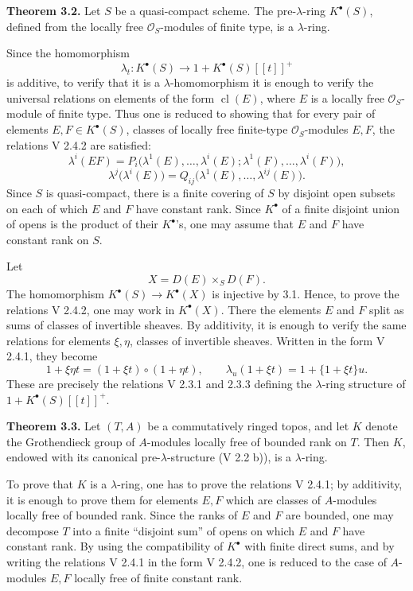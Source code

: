 \documentclass[11pt]{article}
\begin{document}
\textbf{Theorem 3.2.} Let \(S\) be a quasi-compact scheme. The pre-\(\lambda\)-ring \(K^\bullet(S)\), defined from the locally free \(\mathcal O_S\)-modules of finite type, is a \(\lambda\)-ring.

Since the homomorphism
\[
  \lambda_t:K^\bullet(S)\longrightarrow 1+K^\bullet(S)[[t]]^+
\]
is additive, to verify that it is a \(\lambda\)-homomorphism it is enough to verify the universal relations on elements of the form \(\operatorname{cl}(E)\), where \(E\) is a locally free \(\mathcal O_S\)-module of finite type. Thus one is reduced to showing that for every pair of elements \(E,F\in K^\bullet(S)\), classes of locally free finite-type \(\mathcal O_S\)-modules \(E,F\), the relations V 2.4.2 are satisfied:
\[
 \lambda^i(EF)
 =P_i\bigl(\lambda^1(E),\ldots,\lambda^i(E);
           \lambda^1(F),\ldots,\lambda^i(F)\bigr),
\]
\[
 \lambda^j\bigl(\lambda^i(E)\bigr)
 =Q_{ij}\bigl(\lambda^1(E),\ldots,\lambda^{ij}(E)\bigr).
\]
Since \(S\) is quasi-compact, there is a finite covering of \(S\) by disjoint open subsets on each of which \(E\) and \(F\) have constant rank. Since \(K^\bullet\) of a finite disjoint union of opens is the product of their \(K^\bullet\)'s, one may assume that \(E\) and \(F\) have constant rank on \(S\).

Let
\[
  X=D(E)\times_S D(F).
\]
The homomorphism \(K^\bullet(S)\to K^\bullet(X)\) is injective by 3.1. Hence, to prove the relations V 2.4.2, one may work in \(K^\bullet(X)\). There the elements \(E\) and \(F\) split as sums of classes of invertible sheaves. By additivity, it is enough to verify the same relations for elements \(\xi,\eta\), classes of invertible sheaves. Written in the form V 2.4.1, they become
\[
  1+\xi\eta t=(1+\xi t)\circ(1+\eta t),
  \qquad
  \lambda_u(1+\xi t)=1+\{1+\xi t\}u .
\]
These are precisely the relations V 2.3.1 and 2.3.3 defining the \(\lambda\)-ring structure of \(1+K^\bullet(S)[[t]]^+\).

\textbf{Theorem 3.3.} Let \((T,A)\) be a commutatively ringed topos, and let \(K\) denote the Grothendieck group of \(A\)-modules locally free of bounded rank on \(T\). Then \(K\), endowed with its canonical pre-\(\lambda\)-structure (V 2.2 b)), is a \(\lambda\)-ring.

To prove that \(K\) is a \(\lambda\)-ring, one has to prove the relations V 2.4.1; by additivity, it is enough to prove them for elements \(E,F\) which are classes of \(A\)-modules locally free of bounded rank. Since the ranks of \(E\) and \(F\) are bounded, one may decompose \(T\) into a finite ``disjoint sum'' of opens on which \(E\) and \(F\) have constant rank. By using the compatibility of \(K^\bullet\) with finite direct sums, and by writing the relations V 2.4.1 in the form V 2.4.2, one is reduced to the case of \(A\)-modules \(E,F\) locally free of finite constant rank.
\end{document}
